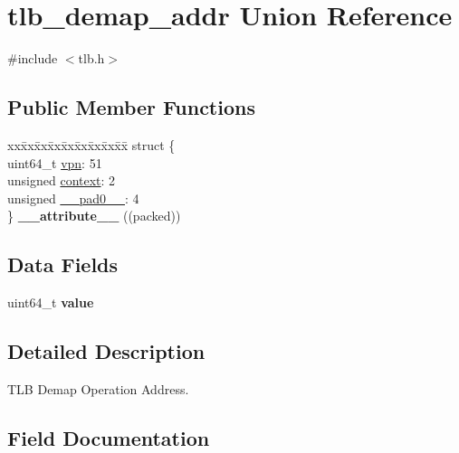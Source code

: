 \hypertarget{uniontlb__demap__addr}{}\section{tlb\+\_\+demap\+\_\+addr Union Reference}
\label{uniontlb__demap__addr}


{\ttfamily \#include $<$tlb.\+h$>$}

\subsection*{Public Member Functions}
\begin{DoxyCompactItemize}
\item 
\mbox{\label{uniontlb__demap__addr_a43e9cd45afa365385edddfc864657519}} 
\begin{tabbing}
xx\=xx\=xx\=xx\=xx\=xx\=xx\=xx\=xx\=\kill
struct \{\\
\>uint64\_t \mbox{\hyperlink{uniontlb__demap__addr_ae3d5881a6f0fc81a418ecd7f51bfeb47}{vpn}}: 51\\
\>unsigned \mbox{\hyperlink{uniontlb__demap__addr_a7cd2950bb8e1b8b979f965ddc266c6aa}{context}}: 2\\
\>unsigned \mbox{\hyperlink{uniontlb__demap__addr_a884f2640ae10fab595974412b15a9317}{\_\_pad0\_\_}}: 4\\
\} {\bfseries \_\_attribute\_\_} ((packed))\\

\end{tabbing}\end{DoxyCompactItemize}
\subsection*{Data Fields}
\begin{DoxyCompactItemize}
\item 
\mbox{\label{uniontlb__demap__addr_a48ab869141db00cbf875a2cc6f106946}} 
uint64\+\_\+t {\bfseries value}
\end{DoxyCompactItemize}


\subsection{Detailed Description}
T\+LB Demap Operation Address. 

\subsection{Field Documentation}
\mbox{\label{uniontlb__demap__addr_a884f2640ae10fab595974412b15a9317}} 
